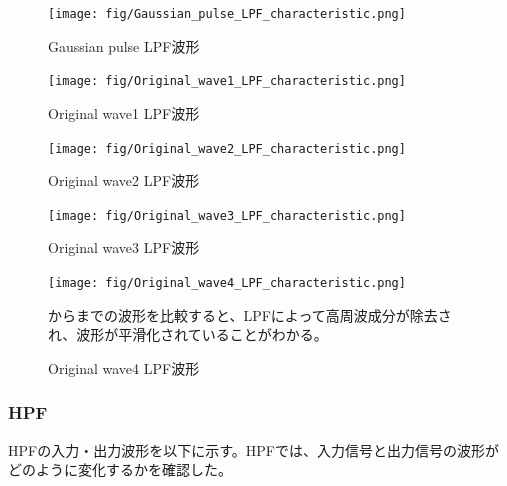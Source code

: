 \documentclass[11pt,dvipdfmx]{jarticle}
\begin{document}
\begin{figure}[H]
  \centering
  \texttt{[image: fig/Gaussian\_pulse\_LPF\_characteristic.png]}
  \caption{Gaussian pulse LPF波形}
  \label{fig:Gaussian_pulse_LPF}
\end{figure}
\begin{figure}[H]
  \centering
  \texttt{[image: fig/Original\_wave1\_LPF\_characteristic.png]}
  \caption{Original wave1 LPF波形}
  \label{fig:Original_wave1_LPF}
\end{figure}
\begin{figure}[H]
  \centering
  \texttt{[image: fig/Original\_wave2\_LPF\_characteristic.png]}
  \caption{Original wave2 LPF波形}
  \label{fig:Original_wave2_LPF}
\end{figure}
\begin{figure}[H]
  \centering
  \texttt{[image: fig/Original\_wave3\_LPF\_characteristic.png]}
  \caption{Original wave3 LPF波形}
  \label{fig:Original_wave3_LPF}
\end{figure}
\begin{figure}[H]
  \centering
  \texttt{[image: fig/Original\_wave4\_LPF\_characteristic.png]}
  \caption{Original wave4 LPF波形}
  \label{fig:Original_wave4_LPF}
からまでの波形を比較すると、LPFによって高周波成分が除去され、波形が平滑化されていることがわかる。
\end{figure}
\subsubsection{HPF}
HPFの入力・出力波形を以下に示す。HPFでは、入力信号と出力信号の波形がどのように変化するかを確認した。
\end{document}
